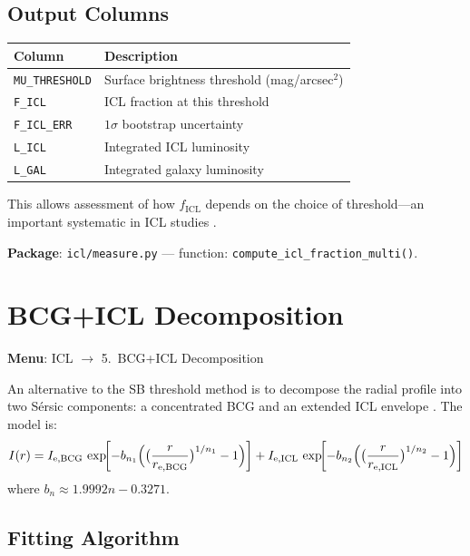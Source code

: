 \documentclass[11pt,fleqn]{book}
\begin{document}
\subsection{Output Columns}

\begin{center}
\begin{tabular}{ll}
\toprule
\textbf{Column} & \textbf{Description} \\
\midrule
\texttt{MU\_THRESHOLD} & Surface brightness threshold (mag/arcsec$^2$) \\
\texttt{F\_ICL} & ICL fraction at this threshold \\
\texttt{F\_ICL\_ERR} & $1\sigma$ bootstrap uncertainty \\
\texttt{L\_ICL} & Integrated ICL luminosity \\
\texttt{L\_GAL} & Integrated galaxy luminosity \\
\bottomrule
\end{tabular}
\end{center}

This allows assessment of how $f_\mathrm{ICL}$ depends on the choice of threshold---an important systematic in ICL studies \parencite[see, e.g.,][]{brough2024}.

\textbf{Package}: \texttt{icl/measure.py} --- function: \texttt{compute\_icl\_fraction\_multi()}.


\section{BCG+ICL Decomposition}
\label{sec:icl-decompose}

\textbf{Menu}: ICL $\to$ 5.\ BCG+ICL Decomposition

An alternative to the SB threshold method is to decompose the radial profile into two S\'ersic components: a concentrated BCG and an extended ICL envelope \parencite{kluge2020,montes2018}.  The model is:
\begin{equation}
  I(r) = I_\mathrm{e,BCG}\,\exp\!\biggl[-b_{n_1}\Bigl(\bigl(\frac{r}{r_\mathrm{e,BCG}}\bigr)^{1/n_1} - 1\Bigr)\biggr]
       + I_\mathrm{e,ICL}\,\exp\!\biggl[-b_{n_2}\Bigl(\bigl(\frac{r}{r_\mathrm{e,ICL}}\bigr)^{1/n_2} - 1\Bigr)\biggr]
\end{equation}
where $b_n \approx 1.9992n - 0.3271$.

\subsection{Fitting Algorithm}
\end{document}
